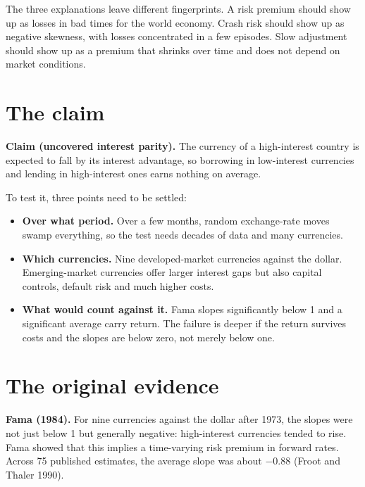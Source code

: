 The three explanations leave different fingerprints. A risk premium should show up as losses in bad times for the world economy. Crash risk should show up as negative skewness, with losses concentrated in a few episodes. Slow adjustment should show up as a premium that shrinks over time and does not depend on market conditions.



\section{The claim}
\label{sec:06-claim}

\begin{callout}
\textbf{Claim (uncovered interest parity).} The currency of a high-interest country is expected to fall by its interest advantage, so borrowing in low-interest currencies and lending in high-interest ones earns nothing on average.
\end{callout}

To test it, three points need to be settled:

\begin{itemize}
  \item \textbf{Over what period.} Over a few months, random exchange-rate moves swamp everything, so the test needs decades of data and many currencies.
  \item \textbf{Which currencies.} Nine developed-market currencies against the dollar. Emerging-market currencies offer larger interest gaps but also capital controls, default risk and much higher costs.
  \item \textbf{What would count against it.} Fama slopes significantly below 1 and a significant average carry return. The failure is deeper if the return survives costs and the slopes are below zero, not merely below one.
\end{itemize}

\section{The original evidence}
\label{sec:06-evidence}

\textbf{Fama (1984).} For nine currencies against the dollar after 1973, the slopes were not just below 1 but generally negative: high-interest currencies tended to rise. Fama showed that this implies a time-varying risk premium in forward rates. Across 75 published estimates, the average slope was about $-0.88$ (Froot and Thaler 1990).

